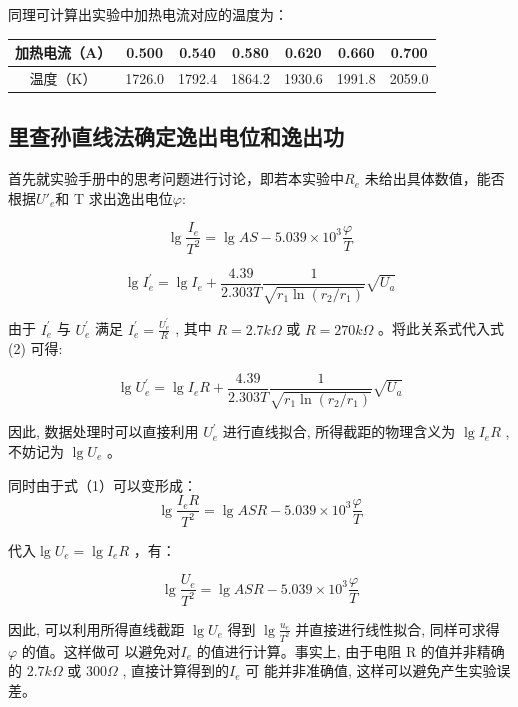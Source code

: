 \documentclass[UTF8]{ctexart}
\begin{document}
同理可计算出实验中加热电流对应的温度为：\\
\begin{center}
  \begin{tabular}{c|c|c|c|c|c|c}
    \hline 加热电流（A）  & 0.500&0.540&0.580&0.620&0.660&0.700 \\
    \hline 温度（K）  & 1726.0&1792.4&1864.2&1930.6&1991.8&2059.0 \\
    \hline
  \end{tabular}
\end{center}


\subsection{里查孙直线法确定逸出电位和逸出功}

首先就实验手册中的思考问题进行讨论，即若本实验中$R_e$ 未给出具体数值，能否根据$U'_e$和 T 求出逸出电位$\varphi$:

\begin{equation}
  \lg \frac{I_{e}}{T^{2}}=\lg AS-5.039 \times 10^{3} \frac{\varphi}{T}\tag*{(1)}
\end{equation}

\begin{equation}
  \lg I_{e}^{\prime}=\lg I_{e}+\frac{4.39}{2.303 T} \frac{1}{\sqrt{r_{1} \ln \left(r_{2} / r_{1}\right)}} \sqrt{U_{a}}\tag*{(2)}
\end{equation}

由于  $I_{e}^{\prime}$  与  $U_{e}^{\prime}$  满足  $I_{e}^{\prime}=\frac{U_{e}^{\prime}}{R}$ , 其中  $R=2.7 k \Omega$  或  $R=270 k \Omega$  。将此关系式代入式 (2) 可得:

$$
\lg U_{e}^{\prime}=\lg I_{e} R+\frac{4.39}{2.303 T} \frac{1}{\sqrt{r_{1} \ln \left(r_{2} / r_{1}\right)}} \sqrt{U_{a}}
$$

因此, 数据处理时可以直接利用  $U_{e}^{\prime}$  进行直线拟合, 所得截距的物理含义为 $ \lg I_{e} R$ , 不妨记为  $\lg U_{e}$  。

同时由于式（1）可以变形成：
$$
\lg \frac{I_{e} R}{T^{2}}=\lg A S R-5.039 \times 10^{3} \frac{\varphi}{T} 
$$

代入$\lg U_{e}= \lg I_{e}R$ ，有：


\begin{equation}
  \lg \frac{U_{e}}{T^{2}} =\lg A S R-5.039 \times 10^{3} \frac{\varphi}{T} \tag*{(3)}
\end{equation}

因此, 可以利用所得直线截距  $\lg U_{e}$  得到 $ \lg \frac{u_{e}}{T^{2}} $ 并直接进行线性拟合, 同样可求得  $\varphi $ 的值。这样做可 以避免对$  I_{e} $ 的值进行计算。事实上, 由于电阻  R  的值并非精确的 $ 2.7 k \Omega$  或  $300 \Omega$ , 直接计算得到的$  I_{e}$  可 能并非准确值, 这样可以避免产生实验误差。
\end{document}
